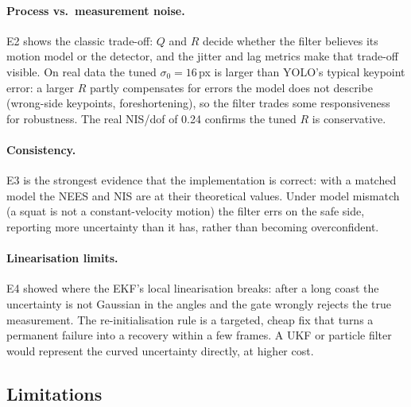 \documentclass[12pt,a4paper]{article}
\begin{document}
\paragraph{Process vs.\ measurement noise.} E2 shows the classic trade-off: $Q$ and $R$ decide whether the
filter believes its motion model or the detector, and the jitter and lag metrics make that trade-off
visible. On real data the tuned $\sigma_0=16$\,px is larger than YOLO's typical keypoint error: a larger
$R$ partly compensates for errors the model does not describe (wrong-side keypoints, foreshortening), so the
filter trades some responsiveness for robustness. The real NIS/dof of 0.24 confirms the tuned $R$ is
conservative.

\paragraph{Consistency.} E3 is the strongest evidence that the implementation is correct: with a matched
model the NEES and NIS are at their theoretical values. Under model mismatch (a squat is not a
constant-velocity motion) the filter errs on the safe side, reporting more uncertainty than it has, rather
than becoming overconfident.

\paragraph{Linearisation limits.} E4 showed where the EKF's local linearisation breaks: after
a long coast the uncertainty is not Gaussian in the angles and the gate wrongly rejects the true
measurement. The re-initialisation rule is a targeted, cheap fix that turns a permanent failure into a
recovery within a few frames. A UKF \cite{julier} or particle filter would represent the curved
uncertainty directly, at higher cost.

\subsection{Limitations}
\label{sec:limits}
\end{document}
